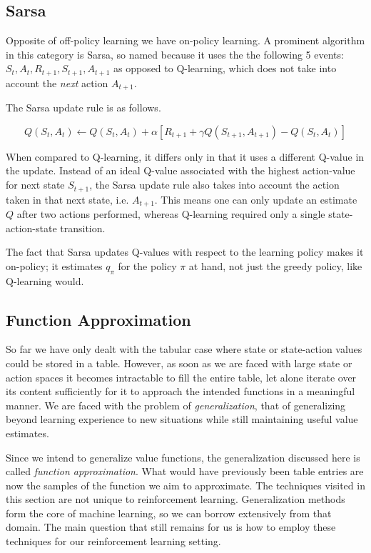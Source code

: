 \subsection{Sarsa}
\label{sub:sarsa}
Opposite of off-policy learning we have on-policy learning.
A prominent algorithm in this category is Sarsa,
so named because it uses the the following 5 events:
$S_t, A_t, R_{t+1}, S_{t+1}, A_{t+1}$
as opposed to Q-learning, which does not take into account
the \textit{next} action $A_{t+1}$.

The Sarsa update rule is as follows.

\begin{equation}
  \label{eq:sarsa}
  Q(S_t, A_t) \leftarrow Q(S_t, A_t) + \alpha \left[ R_{t+1} + \gamma Q(S_{t+1}, A_{t+1}) - Q(S_t, A_t) \right]
\end{equation}

When compared to Q-learning,
it differs only in that it uses a different Q-value in the update.
Instead of an ideal Q-value associated with the highest action-value
for next state $S_{t+1}$,
the Sarsa update rule also takes into account
the action taken in that next state, i.e. $A_{t+1}$.
This means one can only update an estimate $Q$
after two actions performed,
whereas Q-learning required only a single state-action-state transition.

The fact that Sarsa updates Q-values
with respect to the learning policy makes it on-policy;
it estimates $q_\pi$ for the policy $\pi$ at hand,
not just the greedy policy,
like Q-learning would.


\subsection{Function Approximation}
\label{sub:function_approximation}
So far we have only dealt with the tabular case
where state or state-action values could be stored in a table.
However, as soon as we are faced with large state or action spaces
it becomes intractable to fill the entire table,
let alone iterate over its content sufficiently
for it to approach the intended functions in a meaningful manner.
We are faced with the problem of \textit{generalization},
that of generalizing beyond learning experience to new situations
while still maintaining useful value estimates.

Since we intend to generalize value functions,
the generalization discussed here is called \textit{function approximation}.
What would have previously been table entries
are now the samples of the function we aim to approximate.
The techniques visited in this section are not unique to reinforcement learning.
Generalization methods form the core of machine learning,
so we can borrow extensively from that domain.
The main question that still remains for us is how to employ
these techniques for our reinforcement learning setting.


